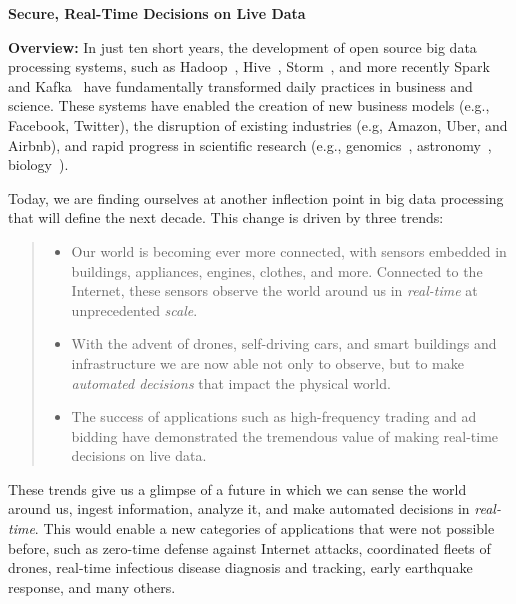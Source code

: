 \documentclass [10pt]{article}
\begin{document}
\pagestyle{empty}



\newpage


\begin{center}
{\Large {\bf Secure, Real-Time Decisions on Live Data}}
\end{center}

{%
{}
{\bf Overview:}  In just ten short years, the development of open source big data processing systems, such as Hadoop~\cite{murthy2011architecture}, Hive~\cite{thusoo2010hive}, Storm~\cite{storm}, and more recently Spark~\cite{spark} and Kafka~\cite{kafka} have fundamentally transformed daily practices in business and science. These systems have enabled the creation of new business models (e.g., Facebook, Twitter), the disruption of existing industries (e.g, Amazon, Uber, and Airbnb), and rapid progress in scientific research (e.g., genomics~\cite{genomics-big-data}, astronomy~\cite{astronomy-big-data}, biology~\cite{biology-big-data}). 

Today, we are finding ourselves at another inflection point in big data processing that will define the next decade. This change is driven by three trends:
\begin{quote}
\begin{itemize}[noitemsep,topsep=0pt,parsep=0pt,partopsep=0pt]
\item Our world is becoming ever more connected, with sensors embedded in buildings, appliances, engines, clothes, and more.  Connected to the Internet, these sensors observe the world around us in \emph{real-time} at unprecedented \emph{scale}.
\item With the advent of drones, self-driving cars, and smart buildings and infrastructure we are now able not only to observe, but to make \emph{automated decisions} that impact the physical world.
\item The success of applications such as high-frequency trading and ad bidding have demonstrated the tremendous value of making real-time decisions on live data.
\end{itemize}
\end{quote}
These trends give us a glimpse of a future in which we can sense the world around us, ingest information, analyze it, and make automated decisions in \emph{real-time}.  
This would enable a new categories of applications that were not possible before, such as zero-time defense against Internet attacks, coordinated fleets of drones, real-time infectious disease diagnosis and tracking, early earthquake response, and many others.

}
\end{document}
